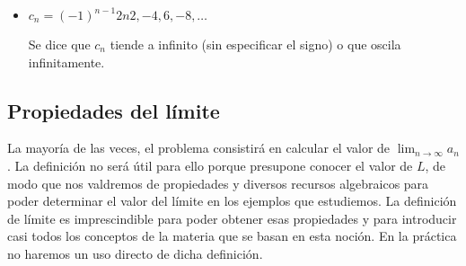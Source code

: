 \documentclass[../Teoría.root.tex]{subfiles}
\begin{document}
\begin{itemize}
\begin{center}
\begin{scaletikzpicturetowidth}{.5\linewidth}
              \end{scaletikzpicturetowidth}
          \end{center}
          \[\lim_{n\to\infty}b_n\,\text{no existe}\] En este caso se dice que \(a_n\) oscila finitamente.
    \item \(c_n=(-1)^{n-1}2n\)\tab\(2,-4,6,-8,\dots\)
          \begin{center}
              \begin{scaletikzpicturetowidth}{.5\linewidth}
              \end{scaletikzpicturetowidth}
          \end{center}
          Se dice que \(c_n\) tiende a infinito (sin especificar el signo) o que oscila infinitamente.
\end{itemize}
\subsection{Propiedades del límite}
La mayoría de las veces, el problema consistirá en calcular el valor de \(\lim_{n\to\infty}a_n\).
La definición no será útil para ello porque presupone conocer el valor de \(L\), de modo que nos valdremos de propiedades y diversos recursos algebraicos para poder determinar el valor del límite en los ejemplos que estudiemos.
La definición de límite es imprescindible para poder obtener esas propiedades y para introducir casi todos los conceptos de la materia que se basan en esta noción.
En la práctica no haremos un uso directo de dicha definición.
\end{document}
